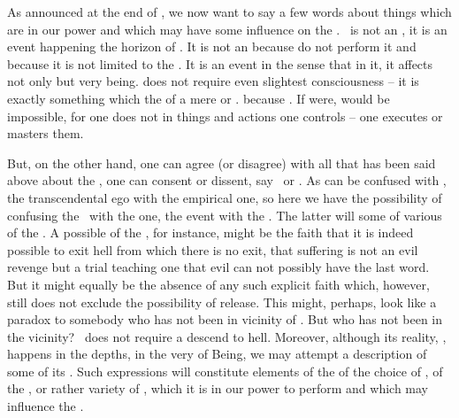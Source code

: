 
\label{sub:reflYes}%
\pa
As announced at the end of
, we now want to say a few words about things which are in our
power and which may have some influence on the \sch. 
\Yes\ is not an , it is an event happening  the horizon of
. It is not an  because  do not perform it and because
it is not limited to the \hoa. It is an event in the sense that 
 in it, it affects not only  but  very
being.  does not require 
even slightest  consciousness -- it is exactly something which
 the  of a mere  or .  because . If  were,
 would be impossible, for one does not  in
things and actions one controls -- one executes or masters them.

But, on the other hand, one can agree (or disagree) with all that has been said
above about the , one can  consent or dissent,
 say \Yes\ or \No. As  can be confused with
, the transcendental ego with the empirical one, so here we have the
possibility of confusing the \sch\ with the  one, the event with the
. The latter will  some  of various
 of the \sch.  A possible  of the ,
for instance, might be the  faith that it is indeed possible to exit
hell from which there is no exit, that suffering is not an evil revenge but a trial
teaching one that evil can not possibly have the last word. But it might equally
be the absence of any such explicit 
faith which, however, still does not exclude the possibility of release.
This might, perhaps, look like a paradox to somebody who has not been in
vicinity of .  But who has not been in the vicinity?  \Yes\ does
not require a descend to hell.  Moreover, although its reality, ,
happens in the  depths, in the very  of Being, we may
attempt a  description of some of its .  Such
 expressions will constitute elements of the  
of the choice of \yes, of the , or rather variety of , which it
is in our power to perform and which may influence the .

